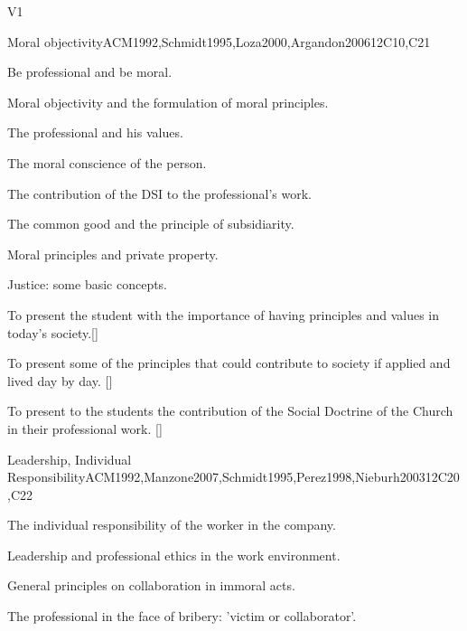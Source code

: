\begin{syllabus}
\begin{competences}{V1}
    \item {}
    \item {}
    \item {}
    \item {}
\end{competences}

\begin{unit}{}{Moral objectivity}{ACM1992,Schmidt1995,Loza2000,Argandon2006}{12}{C10,C21}
\begin{topics}
	\item Be professional and be moral.
	\item Moral objectivity and the formulation of moral principles.
	\item The professional and his values.
	\item The moral conscience of the person.
	\item The contribution of the DSI to the professional's work.
	\item The common good and the principle of subsidiarity.
	\item Moral principles and private property.
	\item Justice: some basic concepts.
\end{topics}
\begin{learningoutcomes}
	\item To present the student with the importance of having principles and values in today's society.[\Usage]
	\item To present some of the principles that could contribute to society if applied and lived day by day. [\Usage]
	\item To present to the students the contribution of the Social Doctrine of the Church in their professional work. [\Usage]
\end{learningoutcomes}
\end{unit}

\begin{unit}{}{Leadership, Individual Responsibility}{ACM1992,Manzone2007,Schmidt1995,Perez1998,Nieburh2003}{12}{C20,C22}
\begin{topics}
	\item The individual responsibility of the worker in the company.
	\item Leadership and professional ethics in the work environment.
	\item General principles on collaboration in immoral acts.
	\item The professional in the face of bribery: 'victim or collaborator'.


\end{topics}
\end{unit}
\end{syllabus}
